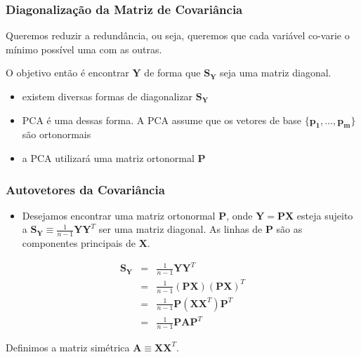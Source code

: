 \begin{frame}[allowframebreaks]
  \frametitle{Diagonalização da Matriz de Covariância}

  Queremos reduzir a redundância, ou seja, queremos que cada variável co-varie o mínimo possível uma com as outras.
  
  O objetivo então é encontrar $\mathbf{Y}$ de forma que $\mathbf{S_Y}$ seja uma matriz diagonal.

  \begin{itemize}
  \item existem diversas formas de diagonalizar $\mathbf{S_Y}$
  \item PCA é uma dessas forma. A PCA assume que os vetores de base $\{\mathbf{p_1}, \ldots , \mathbf{p_m} \}$ são ortonormais
  \item a PCA utilizará uma matriz ortonormal $\mathbf{P}$
  \end{itemize}

\end{frame}

\begin{frame}[allowframebreaks]
  \frametitle{Autovetores da Covariância}
  \begin{itemize}
  \item Desejamos encontrar uma matriz ortonormal $\mathbf{P}$, onde $\mathbf{Y} = \mathbf{P} \mathbf{X}$ esteja sujeito a $\mathbf{S_Y} \equiv \frac{1}{n-1} \mathbf{Y} \mathbf{Y}^T$ ser uma matriz diagonal. As linhas de $\mathbf{P}$ são as componentes principais de $\mathbf{X}$.
  \end{itemize}


\begin{eqnarray}
\mathbf{S_Y} &=& \frac{1}{n-1} \mathbf{Y} \mathbf{Y}^T \nonumber \\
             &=& \frac{1}{n-1} (\mathbf{P} \mathbf{X})(\mathbf{P} \mathbf{X})^T \nonumber \\
             &=& \frac{1}{n-1} \mathbf{P} (\mathbf{X} \mathbf{X}^T) \mathbf{P}^T \nonumber \\
             &=& \frac{1}{n-1} \mathbf{P} \mathbf{A} \mathbf{P}^T 
\end{eqnarray}

Definimos a matriz simétrica $\mathbf{A} \equiv \mathbf{X} \mathbf{X}^T$.
\end{frame} 

